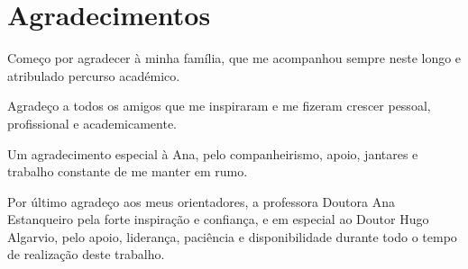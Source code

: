 \chapter{Agradecimentos}
\justifying

Começo por agradecer à minha família, que me acompanhou sempre neste longo e atribulado percurso académico.\par
Agradeço a todos os amigos que me inspiraram e me fizeram crescer pessoal, profissional e academicamente.\par
Um agradecimento especial à Ana, pelo companheirismo, apoio, jantares e trabalho constante de me manter em rumo. \par
Por último agradeço aos meus orientadores, a professora Doutora Ana Estanqueiro pela forte inspiração e confiança, e em especial ao Doutor Hugo Algarvio, pelo apoio, liderança, paciência e disponibilidade durante todo o tempo de realização deste trabalho.\par

\vspace{10mm} %

